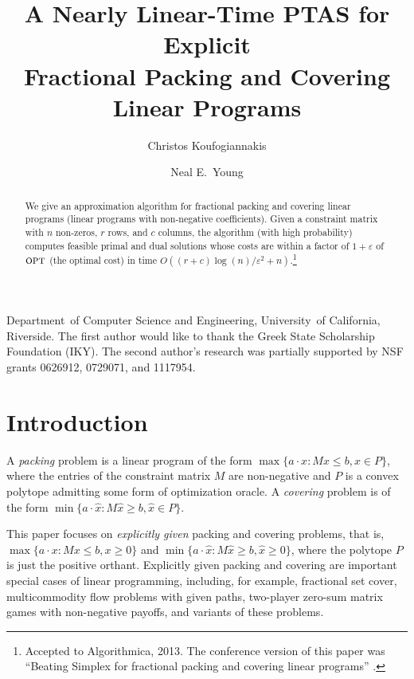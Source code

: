 \documentclass[11pt]{svjour3} \usepackage{fullpage}
\newcommand{\primalOf}[1]{{{#1}}}
\newcommand{\dualOf}[1]{{\hat{#1}}}
\newcommand{\MM}{M}
\newcommand{\xp}{\primalOf x}
\newcommand{\xd}{\dualOf x}
\newcommand{\eps}{\varepsilon}
\newcommand{\opt}{\mbox{{\sc opt}}}
\newcommand{\rows}{r}
\newcommand{\columns}{c}
\newcommand{\inputsize}{n}
\begin{document}
\journalname{}
\def\makeheadbox{}

\title{A Nearly Linear-Time PTAS for Explicit \\Fractional Packing and Covering Linear Programs}
\author
{
	Christos Koufogiannakis \and Neal E.\ Young
}
\institute
        {Department~of Computer Science and Engineering, University~of California, Riverside.
          The first author would like to thank the Greek State Scholarship Foundation (IKY).
          The second author's research was partially supported by
          NSF grants 0626912, 0729071, and 1117954.
}

\date{}








\maketitle



\begin{abstract}
We give an approximation algorithm for fractional
packing and covering linear programs (linear programs with non-negative coefficients).
Given a constraint matrix with $\inputsize$ non-zeros, $\rows$ rows, and $\columns$ columns,
the algorithm (with high probability) computes feasible primal and dual solutions
whose costs are within a factor of $1+\eps$ of  $\opt$ (the optimal cost)
in time $O((\rows+\columns)\log(\inputsize)/\eps^2 + \inputsize)$.\footnote
{Accepted to Algorithmica, 2013.  The conference version of this paper was ``Beating Simplex for fractional packing and covering linear programs'' \cite{Koufogiannakis2007Beating}.
}
\end{abstract}

\section{Introduction}\label{sec:intro}

A {\em packing} problem is a linear program of the form $\max\{a\cdot x : \MM \xp \le b, \xp \in P\}$, where the entries of the constraint matrix $\MM$ are non-negative and $P$ is a convex polytope admitting some form of optimization oracle.  
A {\em covering} problem is of the form $\min\{a\cdot \xd : \MM \xd \ge b, \xd \in P\}$.  

This paper focuses on {\em explicitly given} packing and covering problems, that is, $\max\{a\cdot \xp : \MM \xp \le b, \xp \ge 0\}$ and $\min\{a\cdot \xd : \MM \xd \ge b, \xd \ge 0\}$, where the polytope $P$ is just the positive orthant.  
Explicitly given packing and covering are important special cases of linear programming,
including, for example, fractional set cover, multicommodity flow problems with given paths, two-player zero-sum matrix games with non-negative payoffs, and variants of these problems.
\end{document}
